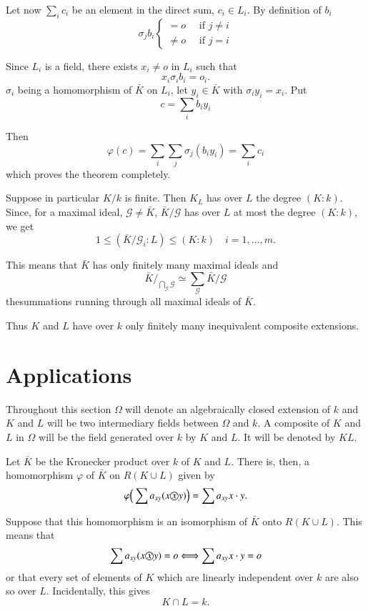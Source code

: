 Let now $\sum\limits_i  c_i$ be an element in the direct sum, $c_i
\in  L_i$. By definition of $b_i$ 
\begin{equation*}
\sigma_j  b_i
\begin{cases}
= o \quad \text{ if }  j \neq i\\
\neq o \quad \text{ if }  j = i
\end{cases}
\end{equation*}

Since $L_i$ is a field, there exists $x_i \neq o$ in $L_i$ such that 
$$
x_i  \sigma_i  b_i = o_i.
$$
$\sigma_i$ being a homomorphism of $\bar{K}$ on $L_i$, let $y_i  \in
\bar{K}$ with $\sigma_i y_i = x_i$. Put 
$$
c = \sum_i  b_i  y_i
$$

Then
$$
\varphi (c) = \sum_i \sum_j  \sigma_j (b_i  y_i) = \sum_i  c_i
$$
which proves the theorem completely.

Suppose in particular $K/k$ is finite. Then $K_L$ has over $L$ the
degree $(K : k)$. Since, for a maximal ideal, $\mathscr{G} \neq
\bar{K}$, $\bar{K}/\mathscr{G}$ has over $L$ at most the degree $(K :
k)$, we get 
$$
1 \le (\bar{K}/\mathscr{G}_i : L) \le (K : k) \quad i = 1, \ldots, m.
$$

This means that $\bar{K}$ has only finitely many maximal ideals and  
$$
\bar{K}/_{\bigcap\limits_{\mathscr{G}} \mathscr{G}}  \simeq
\sum_{\mathscr{G}}   \bar{K}/\mathscr{G} 
$$
the\pageoriginale summations running through all maximal ideals of
$\bar{K}$.   

Thus $K$ and $L$ have over $k$ only finitely many inequivalent
composite extensions. 


\section{Applications}\label{c5:s3} %

Throughout this section $\Omega$ will denote an algebraically closed
extension of $k$ and $K$ and $L$ will be two intermediary fields
between $\Omega$ and $k$. A composite of $K$ and $L$ in $\Omega$ will
be the field generated over $k$ by $K$ and $L$. It will be denoted by
$KL$. 

Let $\bar{K}$ be the Kronecker product over $k$ of $K$ and $L$. There
is, then, a homomorphism $\varphi$ of $\bar{K}$ on $R(K  \cup  L)$
given by  
$$
\varphi\Big(\sum a_{xy}  (x  \text{\textcircled{$x$}}  y)\Big) = \sum  a_{xy}
x\cdot y. 
$$

Suppose that this homomorphism is an isomorphism of $\bar{K}$ onto
$R(K  \cup  L)$. This means that  
$$
\sum a_{xy}  (x  \text{\textcircled{$x$}}  y) = o \Longleftrightarrow \sum
a_{xy}  x\cdot y = o 
$$
or that every set of elements of $K$ which are linearly independent
over $k$ are also so over $L$. Incidentally, this gives 
$$
K  \cap  L = k.
$$


